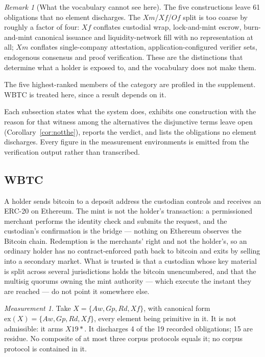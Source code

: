 \documentclass[11pt,reqno]{amsart}
\theoremstyle{plain}
\theoremstyle{definition}
\theoremstyle{remark}
\newtheorem{measurement}[theorem]{Measurement}
\newtheorem{remark}[theorem]{Remark}
\begin{document}
\begin{remark}[What the vocabulary cannot see here]
The five constructions leave 61 obligations that no element discharges. The $Xm$/$Xf$/$Of$ split is too coarse by roughly a
factor of four: $Xf$ conflates custodial wrap, lock-and-mint escrow,
burn-and-mint canonical issuance and liquidity-network fill with no
representation at all; $Xm$ conflates single-company attestation,
application-configured verifier sets, endogenous consensus and proof
verification. These are the distinctions that determine what a holder is
exposed to, and the vocabulary does not make them.
\end{remark}

The five highest-ranked members of the category are profiled in the
supplement. WBTC is treated here, since a result depends on it.

Each
subsection states what the system does, exhibits one construction with the
reason for that witness among the alternatives the disjunctive terms leave open
(Corollary~\ref{cor:notthe}), reports the verdict, and lists the obligations no
element discharges. Every figure in the measurement environments is emitted from
the verification output rather than transcribed.

\subsection{WBTC}\label{case:bri:wbtc}

A holder sends bitcoin to a deposit address the custodian controls and receives an ERC-20 on Ethereum. The mint is not the holder's transaction: a permissioned merchant performs the identity check and submits the request, and the custodian's confirmation is the bridge --- nothing on Ethereum observes the Bitcoin chain. Redemption is the merchants' right and not the holder's, so an ordinary holder has no contract-enforced path back to bitcoin and exits by selling into a secondary market. What is trusted is that a custodian whose key material is split across several jurisdictions holds the bitcoin unencumbered, and that the multisig quorums owning the mint authority --- which execute the instant they are reached --- do not point it somewhere else.

\begin{measurement}\label{meas:case:bri:wbtc}
Take $X = \{Aw,Gp,Rd,Xf\}$, with canonical form
$\mathrm{ex}(X) = \{Aw,Gp,Rd,Xf\}$, every element being primitive in it.
It is not admissible: it arms $X19*$. It discharges 4 of the 19 recorded obligations; 15 are residue. No composite of at most three corpus protocols equals it; no corpus protocol is contained in it.
\end{measurement}
\end{document}
